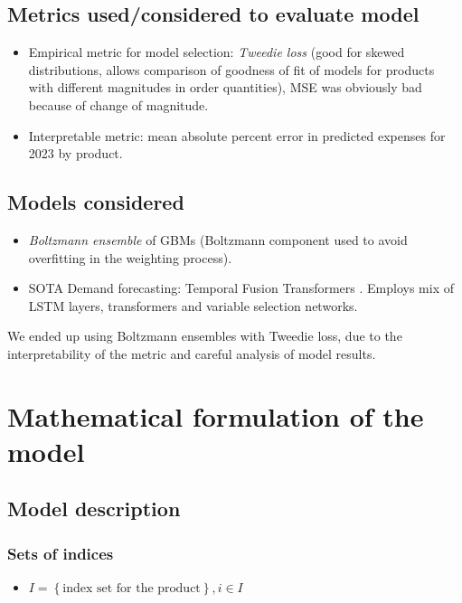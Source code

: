 \documentclass[11pt,twocolumn]{article}
\begin{document}
\subsection{Metrics used/considered to evaluate model}
\begin{itemize}
    \item Empirical metric for model selection: \textit{Tweedie loss} \cite{key5} (good for skewed distributions, allows comparison of goodness of fit of models for products with different magnitudes in order quantities), MSE was obviously bad because of change of magnitude. \\
    \item Interpretable metric: mean absolute percent error in predicted expenses for 2023 by product. \\
    
\end{itemize}
\subsection{Models considered}
\begin{itemize}
    \item \textit{Boltzmann ensemble} of GBMs (Boltzmann component used to avoid overfitting in the weighting process).
    \item SOTA Demand forecasting: Temporal Fusion Transformers \cite{key4}. Employs mix of LSTM layers, transformers and variable selection networks.
\end{itemize}

We ended up using Boltzmann ensembles with Tweedie loss, due to the interpretability of the metric and careful analysis of model results.

\section{Mathematical formulation of the model}
\subsection{Model description}
\subsubsection{Sets of indices}
\begin{itemize}
	\item $I = \left\{ \text{index set for the product} \right\}, i \in I $ 
\end{itemize}
\end{document}
